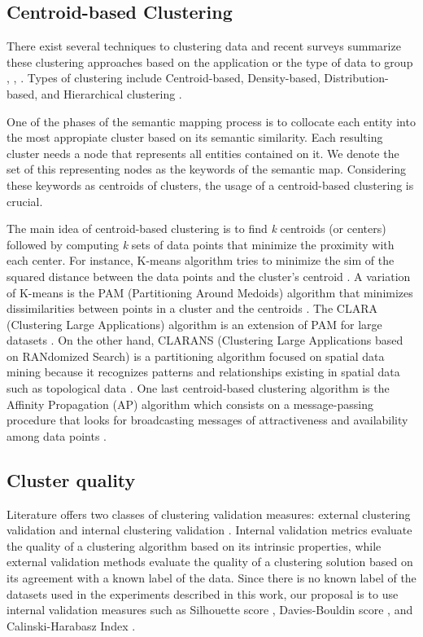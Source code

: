 \documentclass{ieeeaccess}
\begin{document}
\subsection{Centroid-based Clustering}

There exist several techniques to clustering 
data and recent surveys summarize these clustering
approaches based on the application or the type
of data to group \cite{Dongkuan2015}, 
\cite{DBLP:books/crc/aggarwal2013}, 
\cite{firdaus2015survey}. Types of clustering include
Centroid-based, Density-based, Distribution-based, and
Hierarchical clustering \cite{google_2022}. 

One of the phases of the semantic mapping process
is to collocate each entity into the most appropiate
cluster based on its semantic similarity. Each 
resulting cluster needs a node that represents all 
entities contained on it. We denote the set of this
representing nodes as the keywords of the semantic map. 
Considering these keywords as centroids of clusters, 
the usage of a centroid-based clustering is crucial.

The main idea of centroid-based clustering is to find 
\textit{k} centroids (or centers) followed by computing
\textit{k} sets of data points that minimize the proximity
with each center. For instance, K-means algorithm tries
to minimize the sim of the squared distance between the 
data points and the cluster's centroid
\cite{McQueen67}. A variation of K-means
is the PAM (Partitioning Around Medoids) algorithm that
minimizes dissimilarities between points in a cluster 
and the centroids  \cite{kaufmanPAM}. The CLARA 
(Clustering Large Applications) algorithm is 
an extension of PAM for large datasets \cite{kaufmanCLARA}.
On the other hand, CLARANS (Clustering Large 
Applications based on RANdomized Search) is a partitioning
algorithm focused on spatial data mining because it recognizes
patterns and relationships existing in spatial data such as 
topological data \cite{ng2002clarans}. One last centroid-based
clustering algorithm is the Affinity Propagation (AP) 
algorithm which consists on a message-passing procedure
that looks for broadcasting messages of attractiveness and 
availability among data points \cite{frey2007clustering}.

\subsection{Cluster quality}

Literature offers two classes of clustering validation
measures: external  clustering validation and internal
clustering validation \cite{DBLP:books/crc/aggarwal2013}. 
Internal validation metrics evaluate the quality of a 
clustering algorithm based on its intrinsic 
properties, while external validation methods evaluate
the quality of a clustering solution based on its agreement
with a known label of the data. Since there is no known
label of the datasets used in the experiments described
in this work, our proposal is to use internal validation
measures such as Silhouette score \cite{kaufmanPAM}, 
Davies-Bouldin score \cite{davies1979cluster}, 
and Calinski-Harabasz Index \cite{calinski1974dendrite}.
\end{document}
